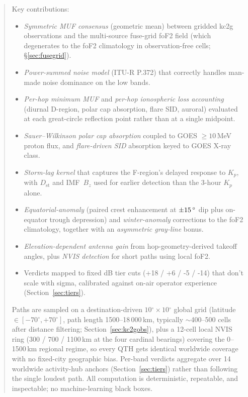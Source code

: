 \documentclass[11pt,a4paper]{article}
\newcommand{\SI}[2]{#1\,\text{#2}}
\newcommand{\degree}{\ensuremath{{}^\circ}}
\begin{document}
\begin{abstract}
Key contributions:
\begin{itemize}\itemsep0pt
\item \emph{Symmetric MUF consensus} (geometric mean) between
      gridded kc2g observations and the multi-source fuse-grid
      foF2 field (which degenerates to the foF2 climatology in
      observation-free cells; \S\ref{sec:fusegrid}).
\item \emph{Power-summed noise model} (ITU-R P.372) that correctly
      handles man-made noise dominance on the low bands.
\item \emph{Per-hop minimum MUF} and \emph{per-hop ionospheric loss
      accounting} (diurnal D-region, polar cap absorption, flare SID,
      auroral) evaluated at each great-circle reflection point rather
      than at a single midpoint.
\item \emph{Sauer--Wilkinson polar cap absorption} coupled to GOES
      $\geq 10$\,MeV proton flux, and \emph{flare-driven SID}
      absorption keyed to GOES X-ray class.
\item \emph{Storm-lag kernel} that captures the F-region's delayed
      response to $K_p$, with $D_{\text{st}}$ and IMF~$B_z$ used for
      earlier detection than the 3-hour $K_p$ alone.
\item \emph{Equatorial-anomaly} (paired crest enhancement at
      $\pm \SI{15}{\degree}$ dip plus on-equator trough depression)
      and \emph{winter-anomaly} corrections to the foF2 climatology,
      together with an \emph{asymmetric gray-line} bonus.
\item \emph{Elevation-dependent antenna gain} from
      hop-geometry-derived takeoff angles, plus \emph{NVIS detection}
      for short paths using local foF2.
\item Verdicts mapped to fixed dB tier cuts (+18 / +6 / -5 / -14)
      that don't scale with sigma, calibrated against on-air
      operator experience (Section~\ref{sec:tiers}).
\end{itemize}

Paths are sampled on a destination-driven $10\degree \times
10\degree$ global grid (latitude $\in [-70\degree, +70\degree]$,
path length 1500--18\,000\,km, typically ${\sim}$400--500 cells
after distance filtering; Section~\ref{sec:kc2gobs}), plus a
12-cell local NVIS ring (300 / 700 / 1100\,km at the four cardinal
bearings) covering the 0--1500\,km regional regime, so every QTH
gets identical worldwide coverage with no fixed-city geographic
bias.  Per-band verdicts aggregate over 14 worldwide activity-hub
anchors (Section~\ref{sec:tiers}) rather than following the single
loudest path.  All computation is deterministic, repeatable,
and inspectable; no machine-learning black boxes.


\end{abstract}
\end{document}
